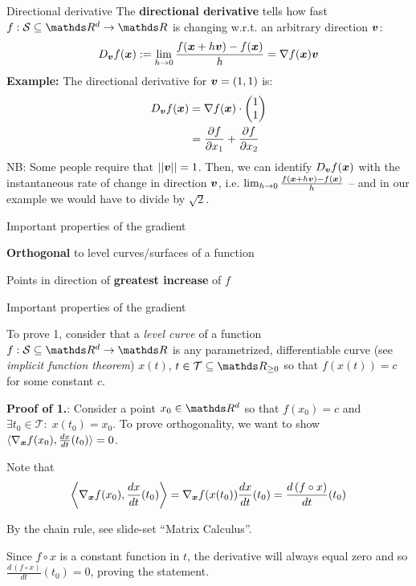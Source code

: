 \documentclass[11pt,compress,t,notes=noshow, xcolor=table]{beamer}
\begin{document}
\begin{framev}{Directional derivative}
The \textbf{directional derivative} tells how fast $f: \mathcal{S}\subseteq \R^d \to \R$ is changing w.r.t. an arbitrary direction $\bm{v}$:
$$
D_{\bm{v}} f(\bm{x}) := \lim_{h \to 0} \frac{f(\bm{x} + h \bm{v}) - f(\bm{x})}{h} = \nabla f(\bm{x}) \bm{v}
$$
\textbf{Example:} The directional derivative for $\bm{v} = (1, 1)$ is:
$$
\begin{aligned}
D_{\bm{v}} f(\bm{x}) &= \nabla f(\bm{x}) \cdot \begin{pmatrix} 1 \\ 1 \end{pmatrix} \\
&= \frac{\partial f}{\partial x_1} + \frac{\partial f}{\partial x_2}
\end{aligned}
$$
NB: Some people require that $||\bm{v}|| = 1$. Then, we can identify $D_{\bm{v}} f(\bm{x})$ with the instantaneous rate of change in direction $\bm{v}$, i.e. $\lim_{h \to 0} \frac{f(\bm{x} + h \bm{v}) - f(\bm{x})}{h}$ -- and in our example we would have to divide by $\sqrt{2}$.
\end{framev}


\begin{framei}{Important properties of the gradient}
\item \textbf{Orthogonal} to level curves/surfaces of a function
\item Points in direction of \textbf{greatest increase} of $f$
\vfill
{}
\end{framei}


\begin{framei}[fs=small]{Important properties of the gradient}
\item To prove 1, consider that a \emph{level curve} of a function $f: \mathcal{S}\subseteq \R^d \to \R$ is any parametrized, differentiable curve (see \emph{implicit function theorem}) $x(t)$, $t\in\mathcal{T}\subseteq\R_{\geq 0}$ so that $f(x(t))=c$ for some constant $c$.
\item \textbf{Proof of 1.}: Consider a point $x_0\in\R^d$ so that $f(x_0)=c$ and $\exists t_0\in\mathcal{T}:\; x(t_0)=x_0$. To prove orthogonality, we want to show $\langle\nabla_{\bm{x}}f(x_0),\frac{d x}{d t}(t_0)\rangle=0$.
\item Note that
$$
\left\langle\nabla_{\bm{x}}f(x_0),\frac{d x}{d t}(t_0)\right\rangle
=\nabla_{\bm{x}}f(x(t_0))\frac{d x}{d t}(t_0)
=\frac{d\, (f\circ x)}{d t}(t_0)
$$
\begin{footnotesize}
By the chain rule, see slide-set ``Matrix Calculus''.
\end{footnotesize}
\item Since $f\circ x$ is a constant function in $t$, the derivative will always equal zero and so $\frac{d\, (f\circ x)}{d t}(t_0)=0$, proving the statement.
\end{framei}
\end{document}
